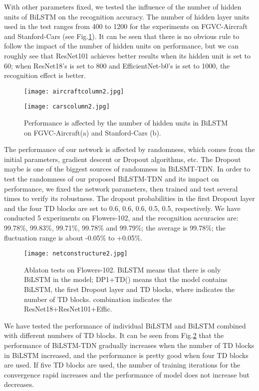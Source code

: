 \documentclass[10pt,twocolumn,letterpaper]{article}
\begin{document}
With other parameters fixed, we tested the influence of the number of hidden units of BiLSTM on the recognition accuracy. The number of hidden layer units used in the test ranges from 400 to 1200 for the experiments on FGVC-Aircraft and Stanford-Cars (see Fig.\ref{hiddennumber}). It can be seen that there is no obvious rule to follow the impact of the number of hidden units on performance, but we can roughly see that ResNet101 achieves better results when its hidden unit is set to 60; when ResNet18's is set to 800 and EfficientNet-b0's is set to 1000, the recognition effect is better.
\begin{figure}[!htbp]
	\begin{minipage}[t]{0.46\textwidth}			
		\texttt{[image: aircraftcolumn2.jpg]}
		\centering	
	\end{minipage}
	\centering	
	\begin{minipage}[t]{0.46\textwidth}			
		\texttt{[image: carscolumn2.jpg]}
		\centering
	\end{minipage}		
	\caption{Performance is affected by the number of hidden units in BiLSTM on FGVC-Aircraft(a) and Stanford-Cars (b).}	\label{hiddennumber}
\end{figure}					
The performance of our network is affected by randomness, which comes from the initial parameters, gradient descent or Dropout algorithms, etc. The Dropout maybe is one of the biggest sources of randomness in BiLSMT-TDN. In order to test the randomness of our proposed BiLSTM-TDN and its impact on performance, we fixed the network parameters, then trained and test several times to verify its robustness. The dropout probabilities  in the first Dropout layer and the four TD blocks are set to 0.6, 0.6, 0.6, 0.5, 0.5, respectively. We have conducted 5 experiments on Flowers-102, and the recognition accuracies are: 99.78\%, 99.83\%, 99.71\%, 99.78\% and 99.79\%; the average is 99.78\%; the fluctuation range is about -0.05\% to +0.05\%.	
\begin{figure}[!htbp]
	\centering
	\texttt{[image: netconstructure2.jpg]}
	\caption{Ablaton tests on Flowers-102. BiLSTM means that there is only BiLSTM in the model; DP1+TD() means that the model contains BiLSTM, the first Dropout layer and  TD blocks, where  indicates the number of TD blocks. combination indicates the ResNet18+ResNet101+Effic.}\label{netconstructure}
\end{figure}			
We have tested the performance of individual BiLSTM and BiLSTM combined with different numbers of TD blocks. It can be seen from Fig.\ref{netconstructure} that the performance of BiLSTM-TDN gradually increases when the number of TD blocks in BiLSTM increased, and the performance is pretty good when four TD blocks are used. If five TD blocks are used, the number of training iterations for the convergence rapid increases and the performance of model does not increase but decreases.
\end{document}
